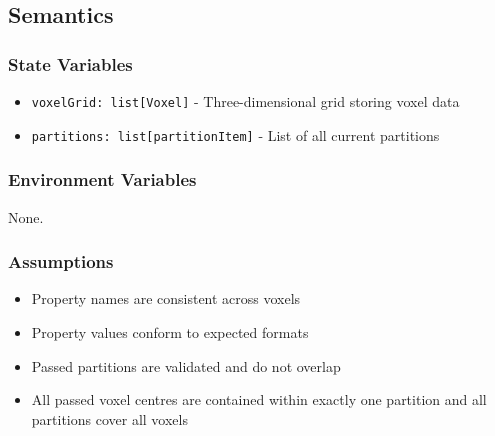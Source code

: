 \documentclass[12pt, titlepage]{article}
\begin{document}
\subsection{Semantics}

\subsubsection{State Variables}
\begin{itemize}
  \item \texttt{voxelGrid: list[Voxel]} - Three-dimensional grid storing voxel data
  \item \texttt{partitions: list[partitionItem]} - List of all current partitions 
\end{itemize}

\subsubsection{Environment Variables}
None.

\subsubsection{Assumptions}
\begin{itemize}
  \item Property names are consistent across voxels
  \item Property values conform to expected formats
  \item Passed partitions are validated and do not overlap
  \item All passed voxel centres are contained within exactly one partition and all partitions cover all voxels
\end{itemize}
\end{document}
